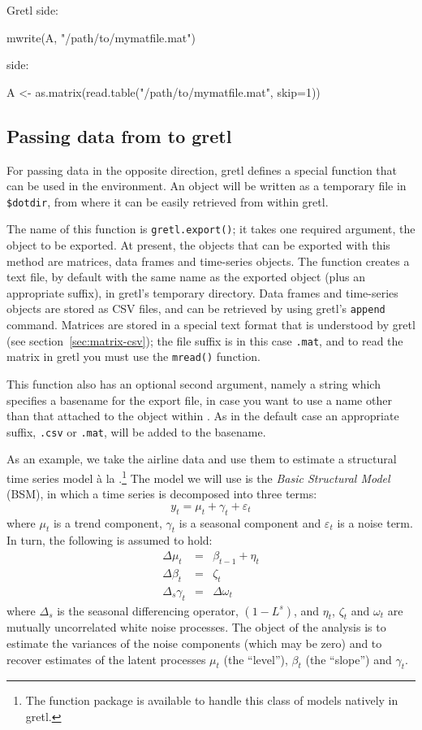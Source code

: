Gretl side:
\begin{code}
  mwrite(A, "/path/to/mymatfile.mat")
\end{code}
 side:
\begin{code}
  A <- as.matrix(read.table("/path/to/mymatfile.mat", skip=1))
\end{code}

\subsection{Passing data from  to gretl}
\label{sec:Rpassing-data}

For passing data in the opposite direction, gretl defines a special
function that can be used in the  environment. An 
object will be written as a temporary file in
\verb|$dotdir|, from where it can be easily retrieved from within
gretl.

The name of this function is \texttt{gretl.export()}; it takes one
required argument, the object to be exported. At present, the objects
that can be exported with this method are matrices, data frames and
time-series objects. The function creates a text file, by default with
the same name as the exported object (plus an appropriate suffix),
in gretl's temporary directory. Data frames and time-series objects
are stored as CSV files, and can be retrieved by using gretl's
\texttt{append} command.  Matrices are stored in a special text format
that is understood by gretl (see section~\ref{sec:matrix-csv}); the
file suffix is in this case \texttt{.mat}, and to read the matrix in
gretl you must use the \texttt{mread()} function.

This function also has an optional second argument, namely a string
which specifies a basename for the export file, in case you want to
use a name other than that attached to the object within . As
in the default case an appropriate suffix, \texttt{.csv} or
\texttt{.mat}, will be added to the basename.

As an example, we take the airline data and use them to estimate a
structural time series model \`a la \cite{harvey89}.\footnote{The
  function package  is available to handle this
  class of models natively in gretl.} The model we will use is
the \emph{Basic Structural Model} (BSM), in which a time series is
decomposed into three terms:
\[
  y_t = \mu_t + \gamma_t + \varepsilon_t
\]
where $\mu_t$ is a trend component, $\gamma_t$ is a seasonal component
and $\varepsilon_t$ is a noise term. In turn, the following is assumed
to hold:
\begin{eqnarray*}
  \Delta \mu_t & = & \beta_{t-1} + \eta_t \\
  \Delta \beta_t & = & \zeta_t \\
  \Delta_s \gamma_t & = & \Delta \omega_t
\end{eqnarray*}
where $\Delta_s$ is the seasonal differencing operator, $(1-L^s)$, and
$\eta_t$, $\zeta_t$ and $\omega_t$ are mutually uncorrelated white
noise processes. The object of the analysis is to estimate the
variances of the noise components (which may be zero) and to recover
estimates of the latent processes $\mu_t$ (the ``level''), $\beta_t$
(the ``slope'') and $\gamma_t$.

